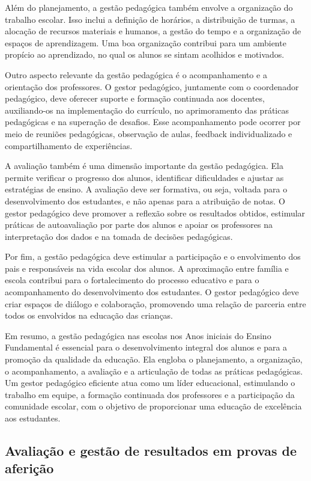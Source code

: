 Além do planejamento, a gestão pedagógica também envolve a organização
do trabalho escolar. Isso inclui a definição de horários, a distribuição
de turmas, a alocação de recursos materiais e humanos, a gestão do tempo
e a organização de espaços de aprendizagem. Uma boa organização
contribui para um ambiente propício ao aprendizado, no qual os alunos se
sintam acolhidos e motivados.

Outro aspecto relevante da gestão pedagógica é o acompanhamento e a
orientação dos professores. O gestor pedagógico, juntamente com o
coordenador pedagógico, deve oferecer suporte e formação continuada aos
docentes, auxiliando-os na implementação do currículo, no aprimoramento
das práticas pedagógicas e na superação de desafios. Esse acompanhamento
pode ocorrer por meio de reuniões pedagógicas, observação de aulas,
feedback individualizado e compartilhamento de experiências.

A avaliação também é uma dimensão importante da gestão pedagógica. Ela
permite verificar o progresso dos alunos, identificar dificuldades e
ajustar as estratégias de ensino. A avaliação deve ser formativa, ou
seja, voltada para o desenvolvimento dos estudantes, e não apenas para a
atribuição de notas. O gestor pedagógico deve promover a reflexão sobre
os resultados obtidos, estimular práticas de autoavaliação por parte dos
alunos e apoiar os professores na interpretação dos dados e na tomada de
decisões pedagógicas.

Por fim, a gestão pedagógica deve estimular a participação e o
envolvimento dos pais e responsáveis na vida escolar dos alunos. A
aproximação entre família e escola contribui para o fortalecimento do
processo educativo e para o acompanhamento do desenvolvimento dos
estudantes. O gestor pedagógico deve criar espaços de diálogo e
colaboração, promovendo uma relação de parceria entre todos os
envolvidos na educação das crianças.

Em resumo, a gestão pedagógica nas escolas nos Anos iniciais do Ensino
Fundamental é essencial para o desenvolvimento integral dos alunos e
para a promoção da qualidade da educação. Ela engloba o planejamento, a
organização, o acompanhamento, a avaliação e a articulação de todas as
práticas pedagógicas. Um gestor pedagógico eficiente atua como um líder
educacional, estimulando o trabalho em equipe, a formação continuada dos
professores e a participação da comunidade escolar, com o objetivo de
proporcionar uma educação de excelência aos estudantes.

\subsection{Avaliação e gestão de resultados em provas de
aferição}\label{avaliauxe7uxe3o-e-gestuxe3o-de-resultados-em-provas-de-aferiuxe7uxe3o}

